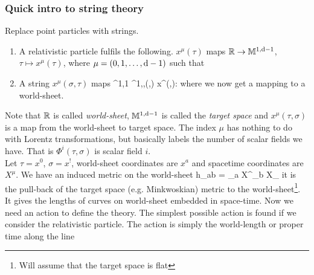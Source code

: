 \subsubsection{Quick intro to string theory}
 Replace point particles with strings. 
 \begin{enumerate} 
 	\item A relativistic particle fulfils the following. $x^\mu (\tau)$ maps $\mathbb{R} \rightarrow \mathbb{M}^{1,\mathrm{d}-1}$, $\tau \mapsto x^\mu(\tau)$, where $\mu=(0,1,\dots,\mathrm{d}-1)$ such that 
 \item A string $x^\mu(\sigma, \tau)$ maps \bse 
 \mR^{1,1} \rightarrow {}^{1,},\quad (\tau,\sigma) \mapsto x^\mu(\tau,\sigma):
 \ese 
 where we now get a mapping to a world-sheet.
 \end{enumerate} 
Note that $\mathbb{R}$ is called \emph{world-sheet}, $\mathbb{M}^{1,\mathrm{d} -1}$ is called the \emph{target space} and $x^\mu(\tau,\sigma)$ is a map from the world-sheet to target space. The index $\mu$ has nothing to do with Lorentz transformations, but basically labels the number of scalar fields we have. That is $\Phi^i(\tau,\sigma)$ is scalar field $i$.
 	\\
 	Let $\tau= x^0$, $\sigma=x^!$, world-sheet coordinates are $x^a$ and spacetime coordinates are $X^\mu$. We have an induced metric on the world-sheet 
 	\be
 	\label{eq:stringsMetricWorldsheet} 
 	h_{ab} = \partial_a X^\mu \partial_b X_\mu
 	\ee 
 	it is the pull-back of the target space (e.g. Minkwoskian) metric to the world-sheet\footnote{Will assume that the target space is flat}. It gives the lengths of curves on world-sheet embedded in space-time. Now we need an action to define the theory. The simplest possible action is found if we consider the relativistic particle. The action is simply the world-length or proper time along the line
 	
